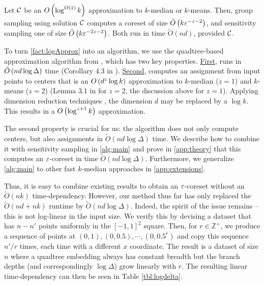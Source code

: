 \begin{fact}\label{fact:logApprox}
Let $\mathcal C$ be an $O\left( \log^{O(1)} k\right)$ approximation to $k$-median or $k$-means.
Then, group sampling using solution $\mathcal C$ computes a coreset of size $\tilde O\left(
k \varepsilon^{-z-2}\right)$, and sensitivity sampling one of size $\tilde O\left( k \varepsilon^{-2z-2}\right)$. 
Both run in time $\tilde O(nd)$, provided $\mathcal C$.
\end{fact}

To turn \cref{fact:logApprox} into an algorithm, we use the quadtree-based \fkmeans approximation algorithm from \cite{cohen2020fast}, which has two key
properties. \underline{First}, \fkmeans runs in $\tilde O\left( n d \log \Delta\right)$ time (Corollary 4.3 in \cite{cohen2020fast}). \underline{Second}, \fkmeans
computes an assignment from input points to centers that is an $O\left( d^z \log k\right)$ approximation to $k$-median ($z=1$) and $k$-means ($z=2$) (Lemma 3.1 in
\cite{cohen2020fast} for $z=2$, the discussion above for $z=1$). Applying dimension reduction techniques \cite{MakarychevMR19}, the dimension $d$ may be
replaced by a $\log k$. This results in a $O\left(\log^{z+1} k\right)$ approximation.

The second property is crucial for us: the algorithm does not only compute centers, but also assignments in $\tilde{O}(nd\log \Delta)$ time.  We describe how to
combine it with sensitivity sampling in \cref{alg:main} and prove in \cref{app:theory} that this computes an $\varepsilon$-coreset in time $\tilde O(nd \log \Delta)$.
Furthermore, we generalize \cref{alg:main} to other fast $k$-median approaches in \cref{app:extensions}.

Thus, it is easy to combine existing results to obtain an $\varepsilon$-coreset without an $\tilde{O}(nk)$ time-dependency.  However, our method thus far has only
replaced the $\tilde{O}(nd + nk)$ runtime by $\tilde{O}(nd \log \Delta)$. Indeed, the spirit of the issue remains -- this is not log-linear in the input size.
We verify this by devising a dataset that has $n - n'$ points uniformly in the $[-1, 1]^2$ square. Then, for $r \in \mathbb{Z}^+$, we produce a sequence of
points at $(0, 1), (0, 0.5), \cdots, (0, 0.5^r)$ and copy this sequence $n' / r$ times, each time with a different $x$ coordinate. The result is a dataset of
size $n$ where a quadtree embedding always has constant breadth but the branch depths (and correspondingly $\log \Delta$) grow linearly with $r$. The resulting
linear time-dependency can then be seen in Table \ref{tbl:logdelta}.

